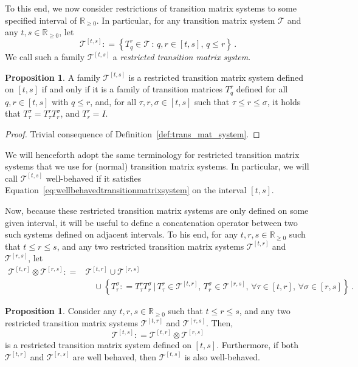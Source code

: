 \documentclass[10pt]{paper}
\theoremstyle{definition}
\newtheorem{proposition}[theorem]{Proposition}
\newcommand{\reals}{\mathbb{R}}
\newcommand{\realsnonneg}{\reals_{\geq 0}}
\newcommand{\coloneqq}{:\!=}
\begin{document}
To this end, we now consider restrictions of transition matrix systems to some specified interval of $\realsnonneg$. In particular, for any transition matrix system $\mathcal{T}$ and any $t,s\in\realsnonneg$, let
\begin{equation*}
\mathcal{T}^{[t,s]} \coloneqq \left\{T_q^r\in\mathcal{T}\,:\,q,r\in[t,s],\, q\leq r\right\}\,.
\end{equation*}
We call such a family $\mathcal{T}^{[t,s]}$ a \emph{restricted transition matrix system}.

\begin{proposition}\label{prop:restr_trans_mat_system_if_semigroup}
A family $\mathcal{T}^{[t,s]}$ is a restricted transition matrix system defined on $[t,s]$ if and only if it is a family of transition matrices $T_q^r$ defined for all $q,r\in[t,s]$ with $q\leq r$, and, for all $\tau,r,\sigma\in[t,s]$ such that $\tau\leq r\leq \sigma$, it holds that $T_\tau^\sigma = T_\tau^rT_r^\sigma$, and $T_r^r=I$.
\end{proposition}
\begin{proof}
Trivial consequence of Definition~\ref{def:trans_mat_system}.
\end{proof}
We will henceforth adopt the same terminology for restricted transition matrix systems that we use for (normal) transition matrix systems. In particular, we will call $\mathcal{T}^{[t,s]}$ well-behaved if it satisfies Equation~\eqref{eq:wellbehavedtransitionmatrixsystem} on the interval $[t,s]$.

Now, because these restricted transition matrix systems are only defined on some given interval, it will be useful to define a concatenation operator between two such systems defined on adjacent intervals. To his end, for any $t,r,s\in\realsnonneg$ such that $t\leq r\leq s$, and any two restricted transition matrix systems $\mathcal{T}^{[t,r]}$ and $\mathcal{T}^{[r,s]}$, let
\begin{align*}
\mathcal{T}^{[t,r]} \otimes \mathcal{T}^{[r,s]} \coloneqq &\mathcal{T}^{[t,r]} \cup \mathcal{T}^{[r,s]} \\
 &\quad \cup \left\{T_\tau^\sigma\coloneqq T_\tau^rT_r^{\sigma}\,\Big\vert\,T_{\tau}^r\in\mathcal{T}^{[t,r]},\,T_r^{\sigma}\in\mathcal{T}^{[r,s]},\,\forall\tau\in[t,r],\,\forall\sigma\in[r,s]\right\}\,.
\end{align*}
\begin{proposition}\label{prop:concat_restr_trans_mat_systems_is_system}
Consider any $t,r,s\in\realsnonneg$ such that $t\leq r\leq s$, and any two restricted transition matrix systems $\mathcal{T}^{[t,r]}$ and $\mathcal{T}^{[r,s]}$. Then,
\begin{equation*}
\mathcal{T}^{[t,s]} \coloneqq \mathcal{T}^{[t,r]}\otimes \mathcal{T}^{[r,s]}
\end{equation*}
is a restricted transition matrix system defined on $[t,s]$. Furthermore, if both $\mathcal{T}^{[t,r]}$ and $\mathcal{T}^{[r,s]}$ are well behaved, then $\mathcal{T}^{[t,s]}$ is also well-behaved.
\end{proposition}
\end{document}
